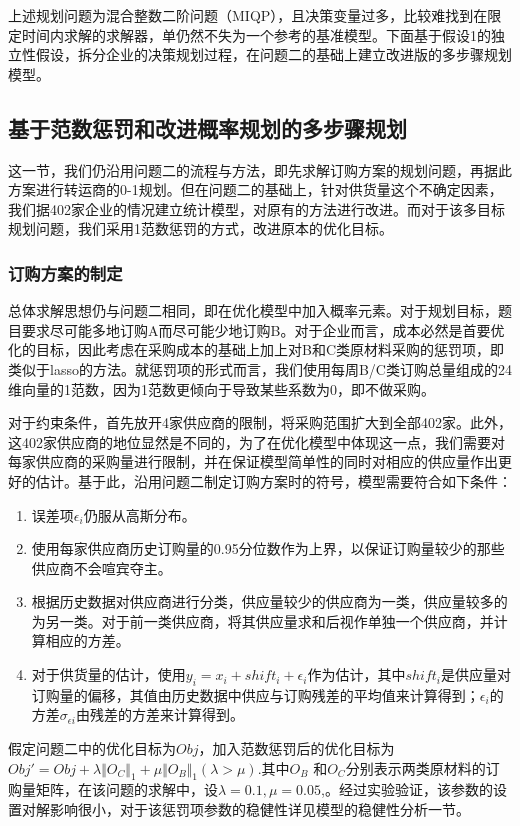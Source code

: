 \documentclass{my_paper}
\begin{document}
上述规划问题为混合整数二阶问题（MIQP），且决策变量过多，比较难找到在限定时间内求解的求解器，单仍然不失为一个参考的基准模型。下面基于假设1的独立性假设，拆分企业的决策规划过程，在问题二的基础上建立改进版的多步骤规划模型。

\subsection{基于范数惩罚和改进概率规划的多步骤规划}
这一节，我们仍沿用问题二的流程与方法，即先求解订购方案的规划问题，再据此方案进行转运商的0-1规划。但在问题二的基础上，针对供货量这个不确定因素，我们据402家企业的情况建立统计模型，对原有的方法进行改进。而对于该多目标规划问题，我们采用1范数惩罚的方式，改进原本的优化目标。

\subsubsection{订购方案的制定}
总体求解思想仍与问题二相同，即在优化模型中加入概率元素。对于规划目标，题目要求尽可能多地订购A而尽可能少地订购B。对于企业而言，成本必然是首要优化的目标，因此考虑在采购成本的基础上加上对B和C类原材料采购的惩罚项，即类似于lasso的方法。就惩罚项的形式而言，我们使用每周B/C类订购总量组成的24维向量的1范数，因为1范数更倾向于导致某些系数为0，即不做采购。

对于约束条件，首先放开4家供应商的限制，将采购范围扩大到全部402家。此外，这402家供应商的地位显然是不同的，为了在优化模型中体现这一点，我们需要对每家供应商的采购量进行限制，并在保证模型简单性的同时对相应的供应量作出更好的估计。基于此，沿用问题二制定订购方案时的符号，模型需要符合如下条件：

\begin{enumerate}
	\item 误差项$\epsilon_i$仍服从高斯分布。
	\item 使用每家供应商历史订购量的0.95分位数作为上界，以保证订购量较少的那些供应商不会喧宾夺主。
	\item 根据历史数据对供应商进行分类，供应量较少的供应商为一类，供应量较多的为另一类。对于前一类供应商，将其供应量求和后视作单独一个供应商，并计算相应的方差。
	\item 对于供货量的估计，使用$y_i=x_i+shift_i+\epsilon_i$作为估计，其中$shift_i$是供应量对订购量的偏移，其值由历史数据中供应与订购残差的平均值来计算得到；$\epsilon_i$的方差$\sigma_{\epsilon i}$由残差的方差来计算得到。
\end{enumerate}

假定问题二中的优化目标为$Obj$，加入范数惩罚后的优化目标为$Obj' = Obj + \lambda \Vert O_C \Vert_1 + \mu \Vert O_B \Vert_1(\lambda> \mu)$.其中$O_B$ 和$O_C$分别表示两类原材料的订购量矩阵，在该问题的求解中，设$\lambda=0.1,\mu=0.05$,。经过实验验证，该参数的设置对解影响很小，对于该惩罚项参数的稳健性详见模型的稳健性分析一节。
\end{document}
